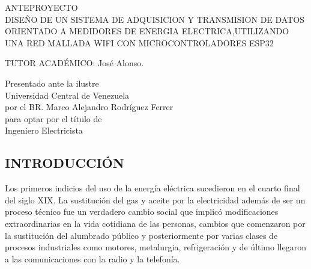 \documentclass[12pt,letterpaper]{article}
\author{} %
\date{31 de julio de 2019} %
\begin{document}
	
	\renewcommand{\listfigurename}{Lista de Figuras}
	\renewcommand{\listtablename}{Lista de Tablas}
	\renewcommand{\contentsname}{Lista de Contenidos}
	\renewcommand{\figurename}{Figura}
	\renewcommand{\tablename}{Tabla}

	
\begin{center}

\vspace{3cm} ANTEPROYECTO \\

\vspace{8cm} DISEÑO DE UN SISTEMA DE ADQUISICION Y TRANSMISION DE DATOS ORIENTADO A MEDIDORES DE ENERGIA ELECTRICA,UTILIZANDO UNA RED MALLADA WIFI CON MICROCONTROLADORES ESP32
\end{center}


\vspace{6cm}

\begin{flushleft}
	TUTOR ACADÉMICO: José Alonso. \\
	
\end{flushleft}

	
\begin{flushright}
	
	
		Presentado ante la ilustre\\
		Universidad Central de Venezuela\\
		por el BR. Marco Alejandro Rodríguez Ferrer \\
		para optar por el título de \\
		Ingeniero Electricista   \\
	


\end{flushright}


\vspace{2cm}
\thispagestyle{empty}
\newpage


\begin{center}
	\section*{ INTRODUCCIÓN}
\end{center}

Los primeros indicios del uso de la energía eléctrica sucedieron en el cuarto final del siglo XIX. La sustitución del gas y aceite por la electricidad además de ser un proceso técnico fue un verdadero cambio social que implicó modificaciones extraordinarias en la vida cotidiana de las personas, cambios que comenzaron por la sustitución del alumbrado público y posteriormente por varias clases de procesos industriales como motores, metalurgia, refrigeración y de último llegaron a las comunicaciones con la radio y la telefonía.\\
\end{document}
